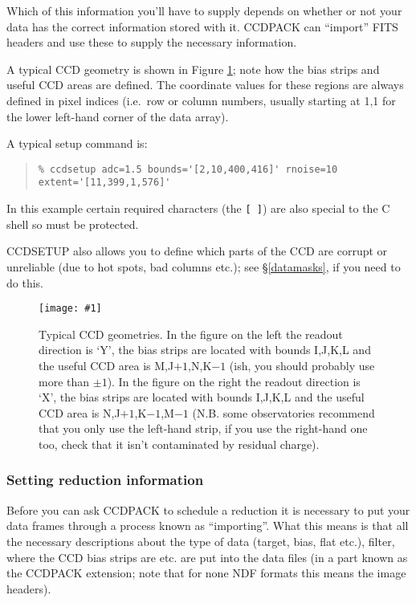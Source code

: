 \documentclass[twoside,11pt]{article}
\newcommand{\htmladdimg}[1]{}
\newcommand{\hyperref}[4]{#2\ref{#4}#3}
\newcommand{\htmlref}[2]{#1}
\renewcommand{\_}{\texttt{\symbol{95}}}
\newenvironment{myquote}{\begin{quote}\begin{small}}{\end{small}\end{quote}}
\newcommand{\text}[1]{{\small \tt #1}}
\newcommand{\xroutine}[1]{\htmlref{{\sc #1}}{#1}}
\newcommand{\myfig} [5] {
  \begin{figure}
    \centering\texttt{[image: \#1]}
    \typeout{#1 inserted on page \arabic{page}}
    \caption{\label{#4}#5}
  \end{figure}
  }
\newcommand{\myfig}[5]{
    \htmladdimg{#3}\\
    Figure: \label{#4} #5
    }
\begin{document}
Which of this information you'll have to supply depends on whether or
not your data has the correct information stored with it.
CCDPACK can ``import'' FITS headers and use these to supply the
necessary information.

A typical CCD geometry is shown in Figure \ref{CCDPICCY}; note how the
bias strips and useful CCD areas are defined. The coordinate values
for these regions are always defined in pixel indices (i.e.\ row or
column numbers, usually starting at 1,1 for the lower left-hand corner
of the data array).

A typical setup command is:
\begin{myquote}
\begin{verbatim}
% ccdsetup adc=1.5 bounds='[2,10,400,416]' rnoise=10 extent='[11,399,1,576]'
\end{verbatim}
\end{myquote}
In this example certain required characters (the \text{[ ]}) are also
special to the C shell so must be protected.

\xroutine{CCDSETUP} also allows you to define which parts of the CCD are
corrupt or unreliable (due to hot spots, bad columns etc.); see
\hyperref{the section on data-masks}{\S}{}{datamasks}, if you need to do this.

\myfig{sun139geo.eps}{}{geo.gif}{CCDPICCY}{Typical CCD geometries.
In the figure on the left the readout direction is `Y', the bias
strips are located with bounds I,J,K,L and the useful CCD area is
M,J$+1$,N,K$-1$ (ish, you should probably use more than $\pm 1$).  In
the figure on the right the readout direction is `X', the bias strips
are located with bounds I,J,K,L and the useful CCD area is
N,J$+1$,K$-1$,M$-1$ (N.B. some observatories recommend that you only
use the left-hand strip, if you use the right-hand one too, check that
it isn't contaminated by residual charge).}

\subsubsection{Setting reduction information \label{settingreductioninfo}}

Before you can ask CCDPACK to schedule a reduction it is necessary to
put your data frames through a process known as ``importing''. What
this means is that all the necessary descriptions about the type of
data (target, bias, flat etc.), filter, where the CCD bias strips are
etc. are put into the data files (in a part known as the CCDPACK
extension; note that for none NDF formats this means the image
headers).
\end{document}
